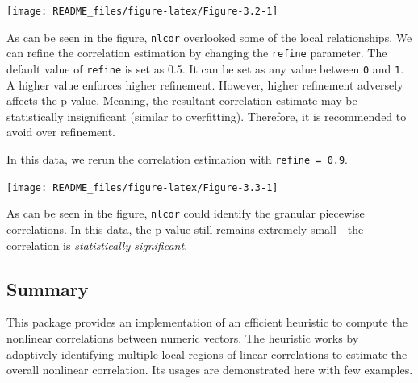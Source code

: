 \documentclass[]{article}
\newenvironment{Shaded}{\begin{snugshade}}{\end{snugshade}}
\newcommand{\CommentTok}[1]{\textcolor[rgb]{0.56,0.35,0.01}{\textit{#1}}}
\newcommand{\DataTypeTok}[1]{\textcolor[rgb]{0.13,0.29,0.53}{#1}}
\newcommand{\FloatTok}[1]{\textcolor[rgb]{0.00,0.00,0.81}{#1}}
\newcommand{\KeywordTok}[1]{\textcolor[rgb]{0.13,0.29,0.53}{\textbf{#1}}}
\newcommand{\NormalTok}[1]{#1}
\newcommand{\OperatorTok}[1]{\textcolor[rgb]{0.81,0.36,0.00}{\textbf{#1}}}
\newcommand{\StringTok}[1]{\textcolor[rgb]{0.31,0.60,0.02}{#1}}
\begin{document}
\begin{center}\texttt{[image: README\_files/figure-latex/Figure-3.2-1]} \end{center}

As can be seen in the figure, \texttt{nlcor} overlooked some of the
local relationships. We can refine the correlation estimation by
changing the \texttt{refine} parameter. The default value of
\texttt{refine} is set as 0.5. It can be set as any value between
\texttt{0} and \texttt{1}. A higher value enforces higher refinement.
However, higher refinement adversely affects the p value. Meaning, the
resultant correlation estimate may be statistically insignificant
(similar to overfitting). Therefore, it is recommended to avoid over
refinement.

In this data, we rerun the correlation estimation with
\texttt{refine\ =\ 0.9}.

\begin{Shaded}
\end{Shaded}

\begin{center}\texttt{[image: README\_files/figure-latex/Figure-3.3-1]} \end{center}

As can be seen in the figure, \texttt{nlcor} could identify the granular
piecewise correlations. In this data, the p value still remains
extremely small---the correlation is \emph{statistically significant}.

\hypertarget{summary}{%
\subsection{Summary}\label{summary}}

This package provides an implementation of an efficient heuristic to
compute the nonlinear correlations between numeric vectors. The
heuristic works by adaptively identifying multiple local regions of
linear correlations to estimate the overall nonlinear correlation. Its
usages are demonstrated here with few examples.
\end{document}
